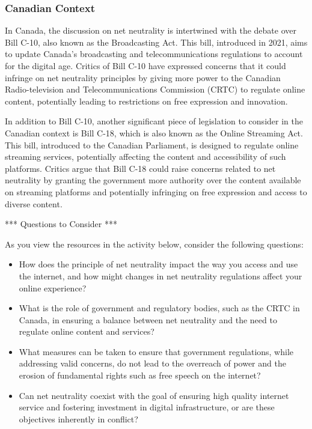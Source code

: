 \documentclass[
  letterpaper,
  DIV=11,
  numbers=noendperiod]{scrreprt}
\providecommand{\tightlist}{%
  \setlength{\itemsep}{0pt}\setlength{\parskip}{0pt}}\usepackage{longtable,booktabs,array}
\begin{document}
\subsubsection*{Canadian Context}\label{canadian-context}

In Canada, the discussion on net neutrality is intertwined with the
debate over Bill C-10, also known as the Broadcasting Act. This bill,
introduced in 2021, aims to update Canada's broadcasting and
telecommunications regulations to account for the digital age. Critics
of Bill C-10 have expressed concerns that it could infringe on net
neutrality principles by giving more power to the Canadian
Radio-television and Telecommunications Commission (CRTC) to regulate
online content, potentially leading to restrictions on free expression
and innovation.

In addition to Bill C-10, another significant piece of legislation to
consider in the Canadian context is Bill C-18, which is also known as
the Online Streaming Act. This bill, introduced to the Canadian
Parliament, is designed to regulate online streaming services,
potentially affecting the content and accessibility of such platforms.
Critics argue that Bill C-18 could raise concerns related to net
neutrality by granting the government more authority over the content
available on streaming platforms and potentially infringing on free
expression and access to diverse content.

*** Questions to Consider ***

As you view the resources in the activity below, consider the following
questions:

\begin{itemize}
\tightlist
\item
  How does the principle of net neutrality impact the way you access and
  use the internet, and how might changes in net neutrality regulations
  affect your online experience?
\item
  What is the role of government and regulatory bodies, such as the CRTC
  in Canada, in ensuring a balance between net neutrality and the need
  to regulate online content and services?
\item
  What measures can be taken to ensure that government regulations,
  while addressing valid concerns, do not lead to the overreach of power
  and the erosion of fundamental rights such as free speech on the
  internet?
\item
  Can net neutrality coexist with the goal of ensuring high quality
  internet service and fostering investment in digital infrastructure,
  or are these objectives inherently in conflict?
\end{itemize}
\end{document}
